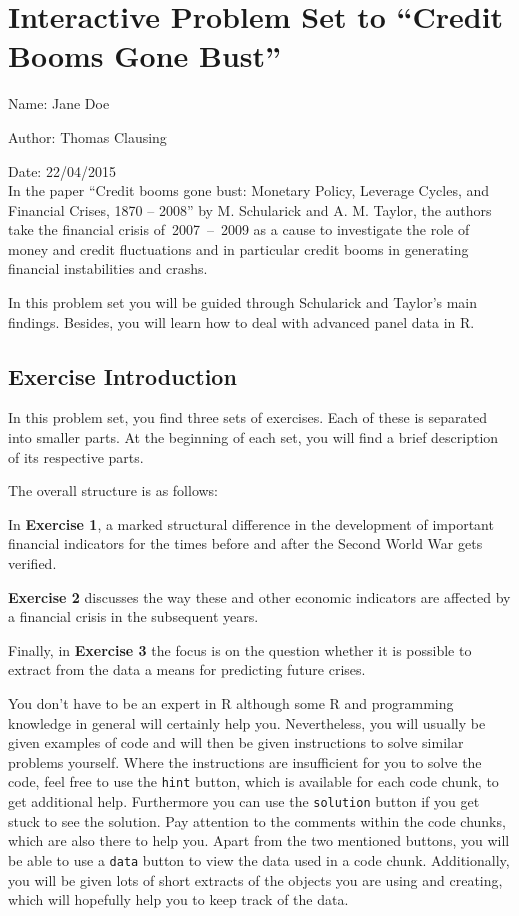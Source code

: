\documentclass[a4paper,11pt,abstract=on]{scrartcl}
\begin{document}
{\sffamily
\section{Interactive Problem Set to ``Credit Booms Gone
Bust''}\label{interactive-problem-set-to-credit-booms-gone-bust}

Name: Jane Doe

Author: Thomas Clausing

Date: 22/04/2015\\

In the paper ``Credit booms gone bust: Monetary Policy, Leverage Cycles,
and Financial Crises, 1870 -- 2008'' by M. Schularick and A. M. Taylor,
the authors take the financial crisis of~\mbox{2007~--~2009} as a cause to
investigate the role of money and credit fluctuations and in particular
credit booms in generating financial instabilities and crashs.

In this problem set you will be guided through Schularick and Taylor's main findings. Besides, you will learn how to deal with advanced panel data in R.

\subsection{\sf Exercise Introduction}\label{exercise-overview}
In this problem set, you find three sets of exercises. Each of these is separated into smaller parts. At the beginning of each set, you will find a brief description of its respective parts.

The overall structure is as follows:

In \textbf{Exercise 1}, a marked structural difference in the development of important financial indicators for the times before and after the Second World War gets verified.

\textbf{Exercise 2} discusses the way these and other economic indicators are affected by a financial crisis in the subsequent years.

Finally, in \textbf{Exercise 3} the focus is on the question whether it is possible to extract from the data a means for predicting future crises.
\begin{spacing}{1.3}
You don't have to be an expert in R although some R and programming
knowledge in general will certainly help you. Nevertheless, you will
usually be given examples of code and will then be given instructions to
solve similar problems yourself. Where the instructions are insufficient
for you to solve the code, feel free to use the \texttt{hint} button,
which is available for each code chunk, to get additional help.
Furthermore you can use the \texttt{solution} button if you get stuck to
see the solution. Pay attention to the comments within the code chunks,
which are also there to help you. Apart from the two mentioned buttons,
you will be able to use a \texttt{data} button to view the data used in
a code chunk. Additionally, you will be given lots of short extracts of
the objects you are using and creating, which will hopefully help you to
keep track of the data.


\end{spacing}}
\end{document}
